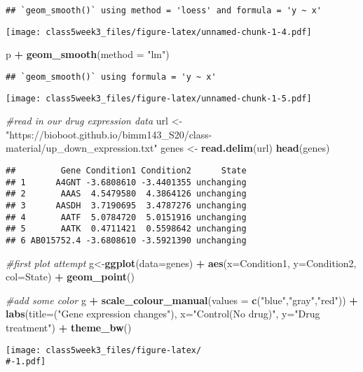 \documentclass[
]{article}
\newenvironment{Shaded}{\begin{snugshade}}{\end{snugshade}}
\newcommand{\AttributeTok}[1]{\textcolor[rgb]{0.13,0.29,0.53}{#1}}
\newcommand{\CommentTok}[1]{\textcolor[rgb]{0.56,0.35,0.01}{\textit{#1}}}
\newcommand{\FunctionTok}[1]{\textcolor[rgb]{0.13,0.29,0.53}{\textbf{#1}}}
\newcommand{\NormalTok}[1]{#1}
\newcommand{\OtherTok}[1]{\textcolor[rgb]{0.56,0.35,0.01}{#1}}
\newcommand{\SpecialCharTok}[1]{\textcolor[rgb]{0.81,0.36,0.00}{\textbf{#1}}}
\newcommand{\StringTok}[1]{\textcolor[rgb]{0.31,0.60,0.02}{#1}}
\begin{document}
\begin{verbatim}
## `geom_smooth()` using method = 'loess' and formula = 'y ~ x'
\end{verbatim}

\texttt{[image: class5week3\_files/figure-latex/unnamed-chunk-1-4.pdf]}

\begin{Shaded}
\begin{Highlighting}[]
\NormalTok{p }\SpecialCharTok{+} \FunctionTok{geom\_smooth}\NormalTok{(}\AttributeTok{method =} \StringTok{"lm"}\NormalTok{)}
\end{Highlighting}
\end{Shaded}

\begin{verbatim}
## `geom_smooth()` using formula = 'y ~ x'
\end{verbatim}

\texttt{[image: class5week3\_files/figure-latex/unnamed-chunk-1-5.pdf]}

\begin{Shaded}
\begin{Highlighting}[]
\CommentTok{\#read in our drug expression data}
\NormalTok{url }\OtherTok{\textless{}{-}} \StringTok{"https://bioboot.github.io/bimm143\_S20/class{-}material/up\_down\_expression.txt"}
\NormalTok{genes }\OtherTok{\textless{}{-}} \FunctionTok{read.delim}\NormalTok{(url)}
\FunctionTok{head}\NormalTok{(genes)}
\end{Highlighting}
\end{Shaded}

\begin{verbatim}
##         Gene Condition1 Condition2      State
## 1      A4GNT -3.6808610 -3.4401355 unchanging
## 2       AAAS  4.5479580  4.3864126 unchanging
## 3      AASDH  3.7190695  3.4787276 unchanging
## 4       AATF  5.0784720  5.0151916 unchanging
## 5       AATK  0.4711421  0.5598642 unchanging
## 6 AB015752.4 -3.6808610 -3.5921390 unchanging
\end{verbatim}

\begin{Shaded}
\begin{Highlighting}[]
\CommentTok{\#first plot attempt}
\NormalTok{g}\OtherTok{\textless{}{-}}\FunctionTok{ggplot}\NormalTok{(}\AttributeTok{data=}\NormalTok{genes) }\SpecialCharTok{+} \FunctionTok{aes}\NormalTok{(}\AttributeTok{x=}\NormalTok{Condition1, }\AttributeTok{y=}\NormalTok{Condition2, }\AttributeTok{col=}\NormalTok{State) }\SpecialCharTok{+} \FunctionTok{geom\_point}\NormalTok{()}

\CommentTok{\#add some color}
\NormalTok{g }\SpecialCharTok{+} \FunctionTok{scale\_colour\_manual}\NormalTok{(}\AttributeTok{values =} \FunctionTok{c}\NormalTok{(}\StringTok{"blue"}\NormalTok{,}\StringTok{"gray"}\NormalTok{,}\StringTok{"red"}\NormalTok{)) }\SpecialCharTok{+}
\FunctionTok{labs}\NormalTok{(}\AttributeTok{title=}\NormalTok{(}\StringTok{"Gene expression changes"}\NormalTok{), }\AttributeTok{x=}\StringTok{"Control(No drug)"}\NormalTok{, }\AttributeTok{y=}\StringTok{"Drug treatment"}\NormalTok{) }\SpecialCharTok{+}
\FunctionTok{theme\_bw}\NormalTok{()}
\end{Highlighting}
\end{Shaded}

\texttt{[image: class5week3\_files/figure-latex/\\\#-1.pdf]}
\end{document}
